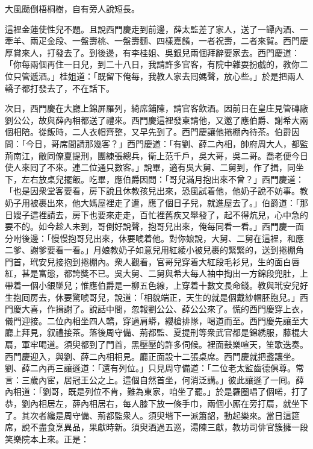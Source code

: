 \begin{myquote}
大風颳倒梧桐樹，自有旁人說短長。
\end{myquote}

這裡金蓮使性兒不題。且說西門慶走到前邊，薛太監差了家人，送了一罈內酒、一牽羊、兩疋金段、一盤壽桃、一盤壽麵、四樣嘉餚，一者祝壽，二者來賀。西門慶厚賞來人，打發去了。到後邊，有李桂姐、吳銀兒兩個拜辭要家去。西門慶道：「你每兩個再住一日兒，到二十八日，我請許多官客，有院中雜耍扮戲的，教你二位只管遞酒。」桂姐道：「既留下俺每，我教人家去囘媽聲，放心些。」於是把兩人轎子都打發去了，不在話下。

次日，西門慶在大廳上錦屏羅列，綺席鋪陳，請官客飲酒。因前日在皇庄見管磚廠劉公公，故與薛內相都送了禮來。西門慶這裡發柬請他，又邀了應伯爵、謝希大兩個相陪。從飯時，二人衣帽齊整，又早先到了。西門慶讓他捲棚內待茶。伯爵因問：「今日，哥席間請那幾客？」西門慶道：「有劉、薛二內相，帥府周大人，都監荊南江，敝同僚夏提刑，團練張總兵，衛上范千戶，吳大哥，吳二哥。喬老便今日使人來囘了不來。連二位通只數客。」說畢，適有吳大舅、二舅到，作了揖，同坐下，左右放桌兒擺飯。吃畢，應伯爵因問：「哥兒滿月抱出來不曾？」西門慶道：「也是因衆堂客要看，房下說且休教孩兒出來，恐風試着他，他奶子說不妨事。教奶子用被裹出來，他大媽屋裡走了遭，應了個日子兒，就進屋去了。」伯爵道：「那日嫂子這裡請去，房下也要來走走，百忙裡舊疾又舉發了，起不得炕兒，心中急的要不的。如今趁人未到，哥倒好說聲，抱哥兒出來，俺每同看一看。」西門慶一面分咐後邊：「慢慢抱哥兒出來，休要唬着他。對你娘說，大舅、二舅在這裡，和應二爹、謝爹要看一看。」月娘教奶子如意兒用紅綾小被兒裹的緊緊的，送到捲棚角門首，玳安兒接抱到捲棚內。衆人觀看，官哥兒穿着大紅段毛衫兒，生的面白唇紅，甚是富態，都誇獎不已。吳大舅、二舅與希大每人袖中掏出一方錦段兜肚，上帶着一個小銀墜兒；惟應伯爵是一柳五色線，上穿着十數文長命錢。教與玳安兒好生抱囘房去，休要驚唬哥兒，說道：「相貌端正，天生的就是個戴紗帽胚胞兒。」{}西門慶大喜，作揖謝了。說話中間，忽報劉公公、薛公公來了。慌的西門慶穿上衣，儀門迎接。二位內相坐四人轎，穿過肩蟒，纓槍排隊，喝道而至。西門慶先讓至大廳上拜見，叙禮接茶。落後周守備、荊都監、夏提刑等衆武官都是錦綉服，藤棍大扇，軍牢喝道。須臾都到了門首，黑壓壓的許多伺候。裡面鼓樂喧天，笙歌迭奏。西門慶迎入，與劉、薛二內相相見。廳正面設十二張桌席。西門慶就把盞讓坐。劉、薛二內再三讓遜道：「還有列位。」只見周守備道：「二位老太監齒德俱尊。常言：三歲內宦，居冠王公之上。這個自然首坐，何消泛講。」彼此讓遜了一囘。薛內相道：「劉哥，既是列位不肯，難為東家，咱坐了罷。」於是羅圈唱了個喏，打了恭，劉內相居左，薛內相居右，每人膝下放一條手巾，兩個小厮在旁打扇，就坐下了。其次者纔是周守備、荊都監衆人。須臾堦下一派簫韶，動起樂來。當日這筵席，說不盡食烹異品，果獻時新。須臾酒過五巡，湯陳三獻，教坊司俳官簇擁一段笑樂院本上來。正是：

